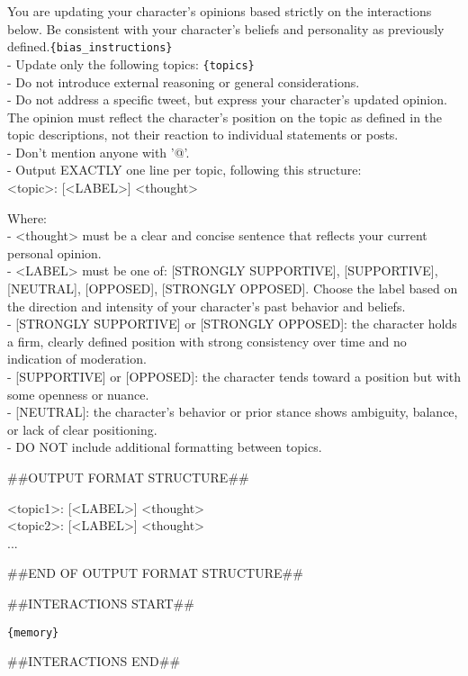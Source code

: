 \begin{tcolorbox}[prompt]
You are updating your character's opinions based strictly on the interactions below. Be consistent with your character's beliefs and personality as previously defined.\texttt{\{bias\_instructions\}}\\
- Update only the following topics: \texttt{\{topics\}}\\
- Do not introduce external reasoning or general considerations.\\
- Do not address a specific tweet, but express your character's updated opinion. The opinion must reflect the character's position on the topic as defined in the topic descriptions, not their reaction to individual statements or posts.\\
- Don't mention anyone with '@'.\\
- Output EXACTLY one line per topic, following this structure:\\
<topic>: [<LABEL>] <thought>
 
\medskip
 
Where:\\
- <thought> must be a clear and concise sentence that reflects your current personal opinion.\\
- <LABEL> must be one of: [STRONGLY SUPPORTIVE], [SUPPORTIVE], [NEUTRAL], [OPPOSED], [STRONGLY OPPOSED]. Choose the label based on the direction and intensity of your character's past behavior and beliefs.\\
\hspace{1cm} - [STRONGLY SUPPORTIVE] or [STRONGLY OPPOSED]: the character holds a firm, clearly defined position with strong consistency over time and no indication of moderation.\\
\hspace{1cm} - [SUPPORTIVE] or [OPPOSED]: the character tends toward a position but with some openness or nuance.\\
\hspace{1cm} - [NEUTRAL]: the character's behavior or prior stance shows ambiguity, balance, or lack of clear positioning.\\
- DO NOT include additional formatting between topics.
 
 \medskip
 
 \#\#OUTPUT FORMAT STRUCTURE\#\#
 
 \smallskip
 <topic1>: [<LABEL>] <thought>\\
 <topic2>: [<LABEL>] <thought>\\...
 
 \smallskip
 \#\#END OF OUTPUT FORMAT STRUCTURE\#\#
 
 \medskip
 
 \#\#INTERACTIONS START\#\#
 
 \medskip
 \texttt{\{memory\}}
 
 \medskip
 \#\#INTERACTIONS END\#\#
\end{tcolorbox}